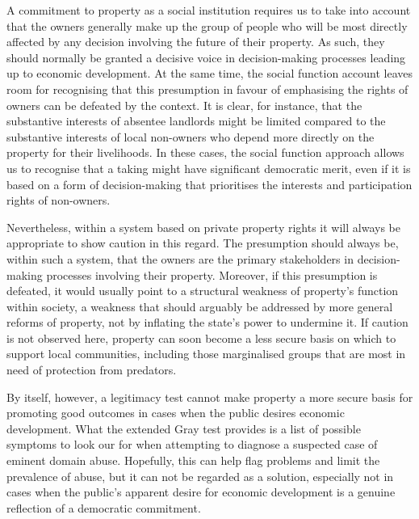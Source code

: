 
A commitment to property as a social institution requires us to take into account that the owners generally make up the group of people who will be most directly affected by any decision involving the future of their property. As such, they should normally be granted a decisive voice in decision-making processes leading up to economic development. At the same time, the social function account leaves room for recognising that this presumption in favour of emphasising the rights of owners can be defeated by the context. It is clear, for instance, that the substantive interests of absentee landlords might be limited compared to the substantive interests of local non-owners who depend more directly on the property for their livelihoods. In these cases, the social function approach allows us to recognise that a taking might have significant democratic merit, even if it is based on a form of decision-making that prioritises the interests and participation rights of non-owners.

Nevertheless, within a system based on private property rights it will always be appropriate to show caution in this regard. The presumption should always be, within such a system, that the owners are the primary stakeholders in decision-making processes involving their property. Moreover, if this presumption is defeated, it would usually point to a structural weakness of property's function within society, a weakness that should arguably be addressed by more general reforms of property, not by inflating the state's power to undermine it. If caution is not observed here, property can soon become a less secure basis on which to support local communities, including those marginalised groups that are most in need of protection from predators.

By itself, however, a legitimacy test cannot make property a more secure basis for promoting good outcomes in cases when the public desires economic development. What the extended Gray test provides is a list of possible symptoms to look our for when attempting to diagnose a suspected case of eminent domain abuse. Hopefully, this can help flag problems and limit the prevalence of abuse, but it can not be regarded as a solution, especially not in cases when the public's apparent desire for economic development is a genuine reflection of a democratic commitment.

